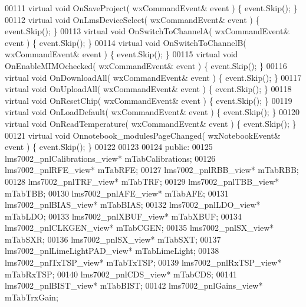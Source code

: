 \begin{DoxyCode}
00111         \textcolor{keyword}{virtual} \textcolor{keywordtype}{void} OnSaveProject( wxCommandEvent& event ) \{ \textcolor{keyword}{event}.Skip(); \}
00112         \textcolor{keyword}{virtual} \textcolor{keywordtype}{void} OnLmsDeviceSelect( wxCommandEvent& event ) \{ \textcolor{keyword}{event}.Skip(); \}
00113         \textcolor{keyword}{virtual} \textcolor{keywordtype}{void} OnSwitchToChannelA( wxCommandEvent& event ) \{ \textcolor{keyword}{event}.Skip(); \}
00114         \textcolor{keyword}{virtual} \textcolor{keywordtype}{void} OnSwitchToChannelB( wxCommandEvent& event ) \{ \textcolor{keyword}{event}.Skip(); \}
00115         \textcolor{keyword}{virtual} \textcolor{keywordtype}{void} OnEnableMIMOchecked( wxCommandEvent& event ) \{ \textcolor{keyword}{event}.Skip(); \}
00116         \textcolor{keyword}{virtual} \textcolor{keywordtype}{void} OnDownloadAll( wxCommandEvent& event ) \{ \textcolor{keyword}{event}.Skip(); \}
00117         \textcolor{keyword}{virtual} \textcolor{keywordtype}{void} OnUploadAll( wxCommandEvent& event ) \{ \textcolor{keyword}{event}.Skip(); \}
00118         \textcolor{keyword}{virtual} \textcolor{keywordtype}{void} OnResetChip( wxCommandEvent& event ) \{ \textcolor{keyword}{event}.Skip(); \}
00119         \textcolor{keyword}{virtual} \textcolor{keywordtype}{void} OnLoadDefault( wxCommandEvent& event ) \{ \textcolor{keyword}{event}.Skip(); \}
00120         \textcolor{keyword}{virtual} \textcolor{keywordtype}{void} OnReadTemperature( wxCommandEvent& event ) \{ \textcolor{keyword}{event}.Skip(); \}
00121         \textcolor{keyword}{virtual} \textcolor{keywordtype}{void} Onnotebook_modulesPageChanged( wxNotebookEvent& event ) \{ \textcolor{keyword}{event}.Skip(); \}
00122         
00123     
00124     \textcolor{keyword}{public}:
00125         lms7002_pnlCalibrations_view* mTabCalibrations;
00126         lms7002_pnlRFE_view* mTabRFE;
00127         lms7002_pnlRBB_view* mTabRBB;
00128         lms7002_pnlTRF_view* mTabTRF;
00129         lms7002_pnlTBB_view* mTabTBB;
00130         lms7002_pnlAFE_view* mTabAFE;
00131         lms7002_pnlBIAS_view* mTabBIAS;
00132         lms7002_pnlLDO_view* mTabLDO;
00133         lms7002_pnlXBUF_view* mTabXBUF;
00134         lms7002_pnlCLKGEN_view* mTabCGEN;
00135         lms7002_pnlSX_view* mTabSXR;
00136         lms7002_pnlSX_view* mTabSXT;
00137         lms7002_pnlLimeLightPAD_view* mTabLimeLight;
00138         lms7002_pnlTxTSP_view* mTabTxTSP;
00139         lms7002_pnlRxTSP_view* mTabRxTSP;
00140         lms7002_pnlCDS_view* mTabCDS;
00141         lms7002_pnlBIST_view* mTabBIST;
00142         lms7002_pnlGains_view* mTabTrxGain;

\end{DoxyCode}
